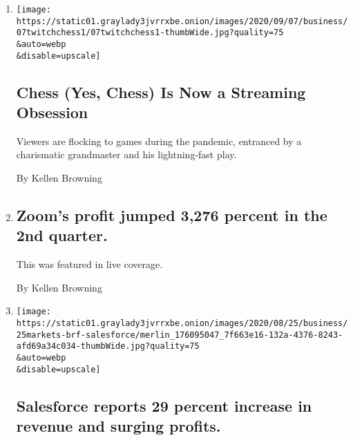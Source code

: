 \begin{enumerate}
\def\labelenumi{\arabic{enumi}.}
\item
  \href{/2020/09/07/technology/chess-new-streaming-obsession-twitch.html}{}

  \texttt{[image: https://static01.graylady3jvrrxbe.onion/images/2020/09/07/business/07twitchchess1/07twitchchess1-thumbWide.jpg?quality=75\\\&auto=webp\\\&disable=upscale]}

  \hypertarget{chess-yes-chess-is-now-a-streaming-obsession}{%
  \subsection{Chess (Yes, Chess) Is Now a Streaming
  Obsession}\label{chess-yes-chess-is-now-a-streaming-obsession}}

  Viewers are flocking to games during the pandemic, entranced by a
  charismatic grandmaster and his lightning-fast play.

  By Kellen Browning
\item
  \href{/live/2020/08/31/business/stock-market-today-coronavirus/zooms-profit-jumped-3276-percent-in-the-2nd-quarter}{}

  \hypertarget{zooms-profit-jumped-3276-percent-in-the-2nd-quarter}{%
  \subsection{Zoom's profit jumped 3,276 percent in the 2nd
  quarter.}\label{zooms-profit-jumped-3276-percent-in-the-2nd-quarter}}

  This was featured in live coverage.

  By Kellen Browning
\item
  \href{/live/2020/08/25/business/stock-market-today-coronavirus/salesforce-earnings}{}

  \texttt{[image: https://static01.graylady3jvrrxbe.onion/images/2020/08/25/business/25markets-brf-salesforce/merlin\_176095047\_7f663e16-132a-4376-8243-afd69a34c034-thumbWide.jpg?quality=75\\\&auto=webp\\\&disable=upscale]}

  \hypertarget{salesforce-reports-29-percent-increase-in-revenue-and-surging-profits}{%
  \subsection{Salesforce reports 29 percent increase in revenue and
  surging
  profits.}\label{salesforce-reports-29-percent-increase-in-revenue-and-surging-profits}}


\end{enumerate}
